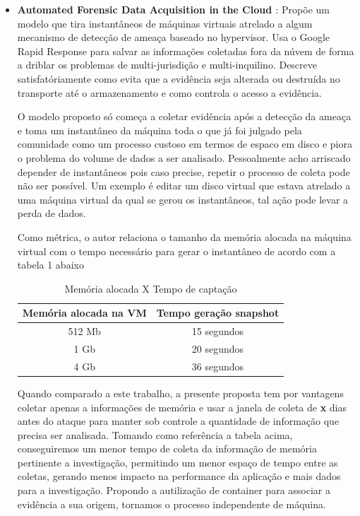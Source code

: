 \documentclass[
	12pt,				%
	openright,			%
	oneside,			%
	a4paper,			%
	english,			%
	french,				%
	spanish,			%
	brazil,				%
	]{abntex2}
\begin{document}
\begin{itemize}
\item \textbf{Automated Forensic Data Acquisition in the Cloud \cite{Reichert2015} }: Propõe um modelo que tira instantâneos de máquinas virtuais atrelado a algum mecanismo de
detecção de ameaça baseado no hypervisor. Usa o Google Rapid Response para salvar as informações coletadas fora da núvem de forma a driblar os problemas de multi-jurisdição e 
multi-inquilino. Descreve satisfatóriamente como evita que a evidência seja alterada ou destruída no transporte até o armazenamento e como controla o acesso a evidência.

O modelo proposto só começa a coletar evidência após a detecção da ameaça e toma um instantâneo da máquina toda o que já foi julgado pela comunidade como um processo custoso em
termos de espaco em disco e piora o problema do volume de dados a ser analisado. Pessoalmente acho arriscado depender de instantâneos pois caso precise, repetir o processo de coleta
pode não ser possível. Um exemplo é editar um disco virtual que estava atrelado a uma máquina virtual da qual se gerou os instantâneos, tal ação pode levar a perda de dados.

Como métrica, o autor relaciona o tamanho da memória alocada na máquina virtual com o tempo necessário para gerar o instantâneo de acordo com a tabela 1 abaixo

\begin{table}[h!]
\centering
\caption{Memória alocada X Tempo de captação}
\label{my-label}
\begin{tabular}{c|c}
\hline
\textbf{Memória alocada na VM} & \textbf{Tempo geração snapshot} \\ \hline
512 Mb                         & 15 segundos                     \\ \hline
1 Gb                           & 20 segundos                     \\ \hline
4 Gb                           & 36 segundos                     \\ \hline
\end{tabular}
\end{table}

Quando comparado a este trabalho, a presente proposta tem por vantagens coletar apenas a informações de memória e usar a janela de coleta de \textbf{x} dias antes do ataque para 
manter sob controle a quantidade de informação que precisa ser analisada. Tomando como referência a tabela acima, conseguiremos um menor tempo de coleta da informação de 
memória pertinente a investigação, permitindo um menor espaço de tempo entre as coletas, gerando menos impacto na performance da aplicação e mais dados para a investigação.
Propondo a autilização de container para associar a evidência a sua origem, tornamos o processo independente de máquina. \\
 

\end{itemize}
\end{document}
